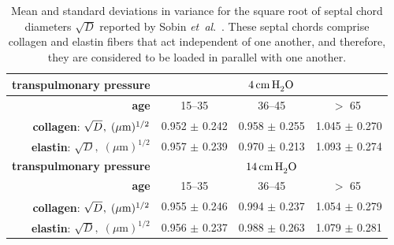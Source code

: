 \begin{table}
    \centering
    \caption{Mean and standard deviations in variance for the square root of septal chord diameters $\sqrt{D}$ reported by Sobin \textit{et~al}.\ \cite{Sobinetal88}.  These septal chords comprise collagen and elastin fibers that act independent of one another, and therefore, they are considered to be loaded in parallel with one another.}
    \label{tab:alveolarProp}
    \footnotesize
    \begin{tabular}{r|ccc} 
        \hline 
        \textbf{transpulmonary pressure} &
        \multicolumn{3}{c}{$4 \, \mathrm{cm} \, \mathrm{H}_2^{\vphantom{|}} \mathrm{O}$} \\ 
        \hline
        \textbf{age} & 15--35 & 36--45 & $>$ 65 $\vphantom{|}^{\vphantom{|}}$ \\ \hline 
        \textbf{collagen}: $\sqrt{D}^{\vphantom{|}}, \; ( \mu \textrm{m} )^{1/2}$ & 
        0.952 $\pm$ 0.242 & 0.958 $\pm$ 0.255 & 1.045 $\pm$ 0.270 \\
        \textbf{elastin}: $\sqrt{D}, \; ( \mu \textrm{m} )^{1/2}$ & 
        0.957 $\pm$ 0.239 & 0.970 $\pm$ 0.213 & 1.093 $\pm$ 0.274 \\
        \hline\hline       
        \textbf{transpulmonary pressure} &
        \multicolumn{3}{c}{$14 \, \mathrm{cm} \, \mathrm{H}_2^{\vphantom{|}} \mathrm{O}$} \\ 
        \hline
        \textbf{age} & 15--35 & 36--45 & $>$ 65 $\vphantom{|}^{\vphantom{|}}$ \\ \hline 
        \textbf{collagen}: $\sqrt{D}^{\vphantom{|}}, \; ( \mu \textrm{m} )^{1/2}$ & 
        0.955 $\pm$ 0.246 & 0.994 $\pm$ 0.237 & 1.054 $\pm$ 0.279 \\
        \textbf{elastin}: $\sqrt{D}, \; ( \mu \textrm{m} )^{1/2}$ & 
        0.956 $\pm$ 0.237 & 0.988 $\pm$ 0.263 & 1.079 $\pm$ 0.281 \\
        \hline
    \end{tabular}
\end{table}

